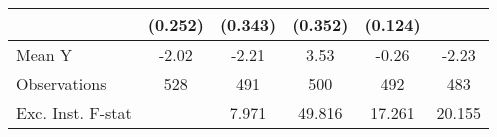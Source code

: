 {\begin{tabular}{l*{5}{c}}
            &     (0.252)         &     (0.343)         &     (0.352)         &     (0.124)         &                     \\
\midrule
Mean Y      &       -2.02         &       -2.21         &        3.53         &       -0.26         &       -2.23         \\
Observations&         528         &         491         &         500         &         492         &         483         \\
Exc. Inst. F-stat&                     &       7.971         &      49.816         &      17.261         &      20.155         \\
\bottomrule
\end{tabular}
}
